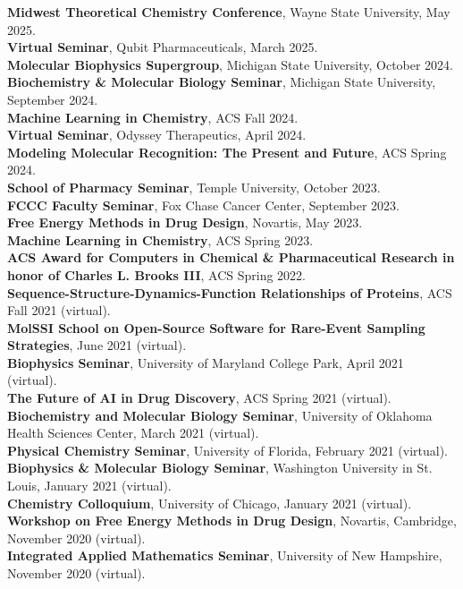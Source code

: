 \documentclass[margin,line]{res}
\begin{document}
\begin{resume}
{\bf Midwest Theoretical Chemistry Conference}, Wayne State University, May 2025.\\
{\bf Virtual Seminar}, Qubit Pharmaceuticals, March 2025.\\
{\bf Molecular Biophysics Supergroup}, Michigan State University, October 2024.\\
{\bf Biochemistry \& Molecular Biology Seminar}, Michigan State University, September 2024.\\
{\bf Machine Learning in Chemistry}, ACS Fall 2024.\\
{\bf Virtual Seminar}, Odyssey Therapeutics, April 2024.\\
{\bf Modeling Molecular Recognition: The Present and Future}, ACS Spring 2024.\\
{\bf School of Pharmacy Seminar}, Temple University, October 2023. \\
{\bf FCCC Faculty Seminar}, Fox Chase Cancer Center, September 2023. \\
{\bf Free Energy Methods in Drug Design}, Novartis, May 2023. \\
{\bf Machine Learning in Chemistry}, ACS Spring 2023.\\
{\bf ACS Award for Computers in Chemical \& Pharmaceutical Research in honor of Charles L. Brooks III}, ACS Spring 2022.\\
{\bf Sequence-Structure-Dynamics-Function Relationships of Proteins}, ACS Fall 2021 (virtual).\\
{\bf MolSSI School on Open-Source Software for Rare-Event Sampling Strategies}, June 2021 (virtual).\\
{\bf Biophysics Seminar}, University of Maryland College Park, April 2021 (virtual).\\
{\bf The Future of AI in Drug Discovery}, ACS Spring 2021 (virtual).\\
{\bf Biochemistry and Molecular Biology Seminar}, University of Oklahoma Health Sciences Center, March 2021 (virtual).\\
{\bf Physical Chemistry Seminar}, University of Florida, February 2021 (virtual).\\
{\bf Biophysics \& Molecular Biology Seminar}, Washington University in St. Louis, January 2021 (virtual).\\
{\bf Chemistry Colloquium}, University of Chicago, January 2021 (virtual).\\
{\bf Workshop on Free Energy Methods in Drug Design}, Novartis, Cambridge, November 2020 (virtual).\\
{\bf Integrated Applied Mathematics Seminar}, University of New Hampshire, November 2020 (virtual).\\

\end{resume}
\end{document}
